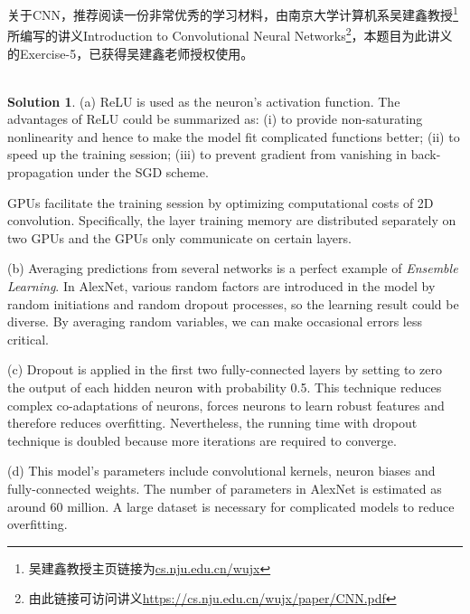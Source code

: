 \documentclass[a4paper,UTF8]{article}
\numberwithin{equation}{section}
\theoremstyle{definition}
\newtheorem*{solution}{Solution}
\begin{document}
关于CNN，推荐阅读一份非常优秀的学习材料，由南京大学计算机系吴建鑫教授\footnote{吴建鑫教授主页链接为\url{cs.nju.edu.cn/wujx}}所编写的讲义Introduction to Convolutional Neural Networks\footnote{由此链接可访问讲义\url{https://cs.nju.edu.cn/wujx/paper/CNN.pdf}}，本题目为此讲义的Exercise-5，已获得吴建鑫老师授权使用。
~\\
~\\
\begin{solution}
\item[(a)] ReLU is used as the neuron's activation function. The advantages of ReLU could be summarized as: (i) to provide non-saturating nonlinearity and hence to make the model fit complicated functions better; (ii) to speed up the training session; (iii) to prevent gradient from vanishing in back-propagation under the SGD scheme.

GPUs facilitate the training session by optimizing computational costs of 2D convolution. Specifically, the layer training memory are distributed separately on two GPUs and the GPUs only communicate on certain layers.

\item[(b)] Averaging predictions from several networks is a perfect example of \textit{Ensemble Learning}. In AlexNet, various random factors are introduced in the model by random initiations and random dropout processes, so the learning result could be diverse. By averaging random variables, we can make occasional errors less critical.

\item[(c)] Dropout is applied in the first two fully-connected layers by setting to zero the output of each hidden neuron with probability 0.5. This technique reduces complex co-adaptations of neurons, forces neurons to learn robust features and therefore reduces overfitting. Nevertheless, the running time with dropout technique is doubled because more iterations are required to converge.

\item[(d)] This model's parameters include convolutional kernels, neuron biases and fully-connected weights. The number of parameters in AlexNet is estimated as around 60 million. A large dataset is necessary for complicated models to reduce overfitting.

\end{solution}
\end{document}
